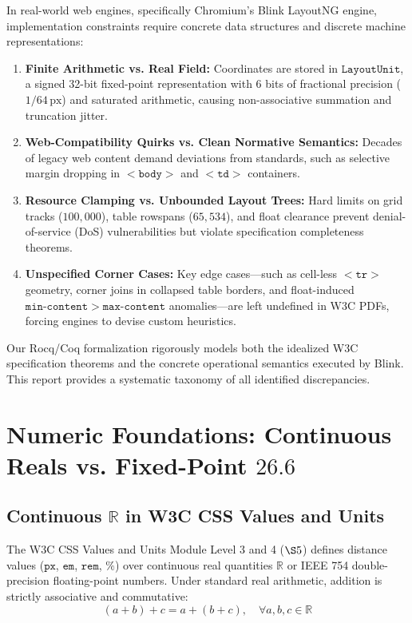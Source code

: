 \documentclass[11pt,a4paper]{article}
\theoremstyle{definition}
\begin{document}
In real-world web engines, specifically Chromium's Blink LayoutNG engine, implementation constraints require concrete data structures and discrete machine representations:
\begin{enumerate}
    \item \textbf{Finite Arithmetic vs. Real Field:} Coordinates are stored in $\mathtt{LayoutUnit}$, a signed 32-bit fixed-point representation with 6 bits of fractional precision ($1/64\,\text{px}$) and saturated arithmetic, causing non-associative summation and truncation jitter.
    \item \textbf{Web-Compatibility Quirks vs. Clean Normative Semantics:} Decades of legacy web content demand deviations from standards, such as selective margin dropping in $\mathtt{<body>}$ and $\mathtt{<td>}$ containers.
    \item \textbf{Resource Clamping vs. Unbounded Layout Trees:} Hard limits on grid tracks ($100{,}000$), table rowspans ($65{,}534$), and float clearance prevent denial-of-service (DoS) vulnerabilities but violate specification completeness theorems.
    \item \textbf{Unspecified Corner Cases:} Key edge cases—such as cell-less $\mathtt{<tr>}$ geometry, corner joins in collapsed table borders, and float-induced $\mathtt{min\text{-}content} > \mathtt{max\text{-}content}$ anomalies—are left undefined in W3C PDFs, forcing engines to devise custom heuristics.
\end{enumerate}

Our Rocq/Coq formalization rigorously models both the idealized W3C specification theorems and the concrete operational semantics executed by Blink. This report provides a systematic taxonomy of all identified discrepancies.

\section{Numeric Foundations: Continuous Reals vs. Fixed-Point $26.6$}

\subsection{Continuous $\mathbb{R}$ in W3C CSS Values and Units}
The W3C CSS Values and Units Module Level 3 and 4 ($\S 5$) defines distance values ($\mathtt{px}$, $\mathtt{em}$, $\mathtt{rem}$, $\mathtt{\%}$) over continuous real quantities $\mathbb{R}$ or IEEE 754 double-precision floating-point numbers. Under standard real arithmetic, addition is strictly associative and commutative:
\begin{equation}
    (a + b) + c = a + (b + c), \quad \forall a, b, c \in \mathbb{R}
\end{equation}
\end{document}
